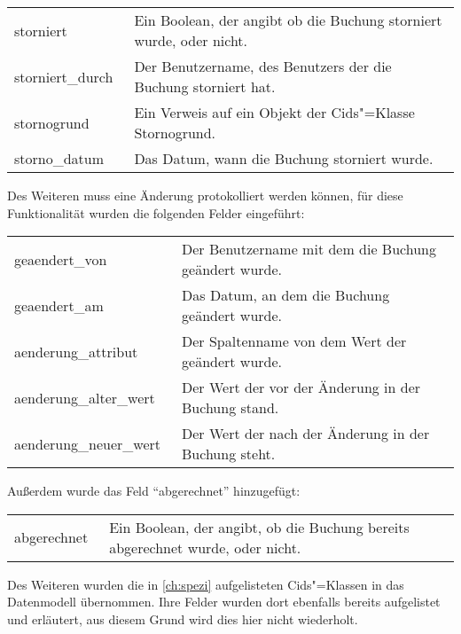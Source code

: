 \begin{tabulary}{\textwidth}{|L|L|}
\hline 
{} 
  &  \tabularnewline
\hline 
\mbox{storniert} & Ein Boolean, der angibt ob die Buchung storniert wurde, oder nicht. \\ 
\hline 
\mbox{storniert\_durch \hspace{8pt}} & Der Benutzername, des Benutzers der die Buchung storniert hat. \\ 
\hline
\mbox{stornogrund} &  Ein Verweis auf ein Objekt der Cids"=Klasse Stornogrund. \\ 
\hline
\mbox{storno\_datum} & Das Datum, wann die Buchung storniert wurde. \\ 
\hline
\end{tabulary} 

Des Weiteren muss eine Änderung protokolliert werden können, für diese Funktionalität wurden die folgenden Felder eingeführt:

\begin{tabulary}{\textwidth}{|L|L|}
\hline 
{} 
  &  \tabularnewline
\hline 
\mbox{geaendert\_von} & Der Benutzername mit dem die Buchung geändert wurde. \\ 
\hline 
\mbox{geaendert\_am} & Das Datum, an dem die Buchung geändert wurde. \\
\hline
\mbox{aenderung\_attribut} &  Der Spaltenname von dem Wert der geändert wurde. \\ 
\hline
\mbox{aenderung\_alter\_wert} & Der Wert der vor der Änderung in der Buchung stand. \\ 
\hline
\mbox{aenderung\_neuer\_wert \hspace{8pt}} & Der Wert der nach der Änderung in der Buchung steht. \\ 
\hline
\end{tabulary} 

Außerdem wurde das Feld "`abgerechnet"' hinzugefügt:

\begin{tabulary}{\textwidth}{|L|L|}
\hline 
{} 
  &  \tabularnewline
\hline 
\mbox{abgerechnet \hspace{8pt}} & Ein Boolean, der angibt, ob die Buchung bereits abgerechnet wurde, oder nicht. \\ 
\hline
\end{tabulary} 

Des Weiteren wurden die in \autoref{ch:spezi} aufgelisteten Cids"=Klassen in das Datenmodell übernommen. Ihre Felder wurden dort ebenfalls bereits aufgelistet und erläutert, aus diesem Grund wird dies hier nicht wiederholt.


